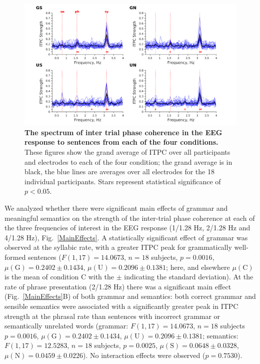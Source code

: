 \documentclass[a4paper,10pt,twoside]{article}
\begin{document}
{\begin{figure}[tbp]
\includegraphics[width=\linewidth]{grand_average.png}
\caption{\textbf{The spectrum of inter trial phase coherence in the
    EEG response to sentences from each of the four conditions.} These
  figures show the grand average of ITPC over all participants and
  electrodes to each of the four condition; the grand average is in
  black, the blue lines are averages over all electrodes for the 18
  individual participants. Stars represent statistical significance of
  $p<0.05$.}
\label{Fig1}
\end{figure}

We analyzed whether there were significant main effects of grammar and
meaningful semantics on the strength of the inter-trial phase
coherence at each of the three frequencies of interest in the EEG
response (1/1.28 Hz, 2/1.28 Hz and 4/1.28 Hz),
Fig.~\ref{MainEffects}. A statistically significant effect of grammar
was observed at the syllabic rate, with a greater ITPC peak for
grammatically well-formed sentences ($F(1,17)=14.0673$, $n=18$ subjects,
$p=0.0016$, $\mu(\mathrm{G}) = 0.2402 \pm 0.1434$, $\mu(\mathrm{U}) =
0.2096 \pm 0.1381$; here, and elsewhere $\mu(\mathrm{C})$ is the mean of
condition C with the $\pm$ indicating the standard deviation). At the
rate of phrase presentation (2/1.28 Hz) there was a significant main
effect (Fig.~\ref{MainEffects}B) of both grammar and semantics: both
correct grammar and sensible semantics were associated with a
significantly greater peak in ITPC strength at the phrasal rate than
sentences with incorrect grammar or semantically unrelated words
(grammar: $F(1,17)=14.0673$, $n=18$ subjects $p=0.0016$, $\mu(\mathrm{G})=
0.2402 \pm 0.1434$, $\mu(\mathrm{U})= 0.2096 \pm 0.1381$; semantics:
 $F(1,17)=12.5283$, $n=18$ subjects, $p=0.0025$, $\mu(\mathrm{S}) = 0.0648
\pm 0.0328$, $\mu(\mathrm{N}) = 0.0459 \pm 0.0226$). No interaction
effects were observed ($p=0.7530$).

}
\end{document}
